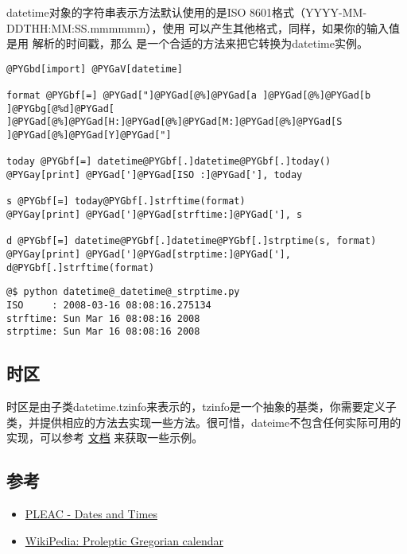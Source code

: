 \documentclass[letterpaper,10pt,english]{manual}
\begin{document}
datetime对象的字符串表示方法默认使用的是ISO 8601格式（YYYY-MM-DDTHH:MM:SS.mmmmmm），使用  可以产生其他格式，同样，如果你的输入值是用  解析的时间戳，那么  是一个合适的方法来把它转换为datetime实例。

\begin{Verbatim}[commandchars=@\[\]]
@PYGbd[import] @PYGaV[datetime]

format @PYGbf[=] @PYGad["]@PYGad[@%]@PYGad[a ]@PYGad[@%]@PYGad[b ]@PYGbg[@%d]@PYGad[ ]@PYGad[@%]@PYGad[H:]@PYGad[@%]@PYGad[M:]@PYGad[@%]@PYGad[S ]@PYGad[@%]@PYGad[Y]@PYGad["]

today @PYGbf[=] datetime@PYGbf[.]datetime@PYGbf[.]today()
@PYGay[print] @PYGad[']@PYGad[ISO :]@PYGad['], today

s @PYGbf[=] today@PYGbf[.]strftime(format)
@PYGay[print] @PYGad[']@PYGad[strftime:]@PYGad['], s

d @PYGbf[=] datetime@PYGbf[.]datetime@PYGbf[.]strptime(s, format)
@PYGay[print] @PYGad[']@PYGad[strptime:]@PYGad['], d@PYGbf[.]strftime(format)
\end{Verbatim}

\begin{Verbatim}[commandchars=@\[\]]
@$ python datetime@_datetime@_strptime.py
ISO     : 2008-03-16 08:08:16.275134
strftime: Sun Mar 16 08:08:16 2008
strptime: Sun Mar 16 08:08:16 2008
\end{Verbatim}


\subsection{时区}

时区是由子类datetime.tzinfo来表示的，tzinfo是一个抽象的基类，你需要定义子类，并提供相应的方法去实现一些方法。很可惜，dateime不包含任何实际可用的实现，可以参考 \href{http://docs.python.org/lib/datetime-tzinfo.html}{文档} 来获取一些示例。


\subsection{参考}
\begin{itemize}
\item {} 
\href{http://pleac.sourceforge.net/pleac\_python/datesandtimes.html}{PLEAC - Dates and Times}

\item {} 
\href{http://en.wikipedia.org/wiki/Proleptic\_Gregorian\_calendar}{WikiPedia: Proleptic Gregorian calendar}

\end{itemize}
\end{document}

